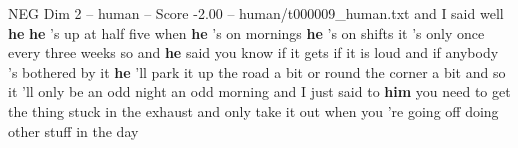 \begin{textsample}{NEG Dim 2 – human – Score -2.00 – human/t000009\_human.txt}  \label{ex:f2_neg_007}
and I said well \textbf{he} \textbf{he} 's up at half five when \textbf{he} 's on mornings \textbf{he} 's on shifts it 's only once every three weeks so and \textbf{he} said you know if it gets if it is loud and if anybody 's bothered by it \textbf{he} 'll park it up the road a bit or round the corner a bit and so it 'll only be an odd night an odd morning and I just said to \textbf{him} you need to get the thing stuck in the exhaust and only take it out when you 're going off doing other stuff in the day

\end{textsample}
